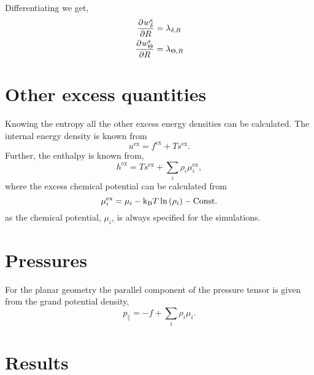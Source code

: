 \documentclass[12pt, letterpaper]{article}
\newcommand*{\pd}[3][]{\frac{\partial^{#1}#2}{\partial{#3}^{#1}}}%
\newcommand*{\lb}{\ensuremath{\left(}}
\newcommand*{\rb}{\ensuremath{\right)}}
\newcommand{\excess}{\ensuremath{\text{ex}}\xspace}
\newcommand{\kB}{\ensuremath{\text{k}_{\text{B}}}\xspace}
\begin{document}
Differentiating we get,
\begin{align}
  \label{eq:generic_weight_functions_steady_diff}
  \pd{w_\delta^{\rm{s}}}{R} &= \lambda_{\delta,R} \\
  \pd{w_\Theta^{\rm{s}}}{R} &= \lambda_{\Theta,R}
\end{align}


\section{Other excess quantities}
Knowing the entropy all the other excess energy densities can be
calculated. The internal energy density is known from
\begin{equation}
  \label{eq:energy}
  u^\excess = f^\excess + T s^\excess.
\end{equation}
Further, the enthalpy is known from,
\begin{equation}
  \label{eq:enthalpy}
  h^\excess = T s^\excess + \underset{i}{\sum} \rho_i \mu_i^\excess,
\end{equation}
where the excess chemical potential can be calculated from
\begin{equation}
  \label{eq:chem_pot}
  \mu_i^\excess = \mu_i - \kB T \ln \lb \rho_i \rb - \rm{Const.}
\end{equation}
as the chemical potential, $\mu_i$, is always specified for the
simulations. 

\section{Pressures}
For the planar geometry the parallel component of the pressure tensor
is given from the grand potential density,
\begin{equation}
  \label{eq:parallel_pressure}
  p_\parallel = - f + \underset{i}{\sum} \rho_i \mu_i.
\end{equation}


\section{Results}



\clearpage


\end{document}

